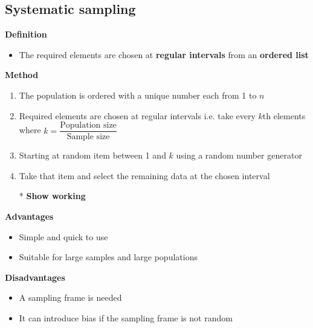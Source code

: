 \subsection{Systematic sampling}
\textbf{Definition}
\begin{itemize}
	\item The required elements are chosen at \textbf{regular intervals} from an \textbf{ordered list}
\end{itemize}
\textbf{Method}
\begin{enumerate}
	\item The population is ordered with a unique number each from 1 to $n$
	\item Required elements are chosen at regular intervals i.e. take every $k$th elements where $k=\dfrac{\text{Population size}}{\text{Sample size}}$
	\item Starting at random item between 1 and $k$ using a random number generator
	\item Take that item and select the remaining data at the chosen interval
	\item[*] \textbf{Show working}
\end{enumerate}
\textbf{Advantages}
\begin{itemize}
	\item Simple and quick to use
	\item Suitable for large samples and large populations
\end{itemize}
\textbf{Disadvantages}
\begin{itemize}
	\item A sampling frame is needed
	\item It can introduce bias if the sampling frame is not random
\end{itemize}
